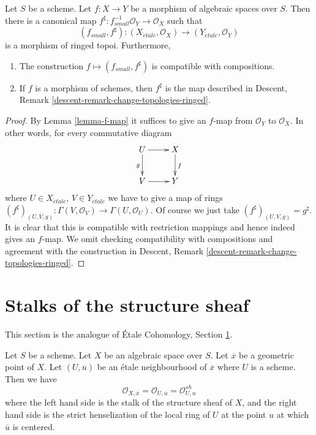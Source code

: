 \begin{lemma}
\label{lemma-morphism-ringed-topoi}
Let $S$ be a scheme.
Let $f : X \to Y$ be a morphism of algebraic spaces over $S$.
Then there is a canonical map
$f^\sharp : f_{small}^{-1}\mathcal{O}_Y \to \mathcal{O}_X$ such that
$$
(f_{small}, f^\sharp) :
(X_{\acute{e}tale}, \mathcal{O}_X)
\longrightarrow
(Y_{\acute{e}tale}, \mathcal{O}_Y)
$$
is a morphism of ringed topoi. Furthermore,
\begin{enumerate}
\item The construction $f \mapsto (f_{small}, f^\sharp)$ is compatible with
compositions.
\item If $f$ is a morphism of schemes, then $f^\sharp$ is the map described in
Descent, Remark \ref{descent-remark-change-topologies-ringed}.
\end{enumerate}
\end{lemma}

\begin{proof}
By Lemma \ref{lemma-f-map} it suffices to give an $f$-map from
$\mathcal{O}_Y$ to $\mathcal{O}_X$. In other words, for every
commutative diagram
$$
\xymatrix{
U \ar[d]_g \ar[r] & X \ar[d]^f \\
V \ar[r] & Y
}
$$
where $U \in X_{\acute{e}tale}$, $V \in Y_{\acute{e}tale}$ we have to give a
map of rings
$
(f^\sharp)_{(U, V, g)} :
\Gamma(V, \mathcal{O}_V)
\to
\Gamma(U, \mathcal{O}_U).
$
Of course we just take $(f^\sharp)_{(U, V, g)} = g^\sharp$.
It is clear that this is compatible with restriction mappings
and hence indeed gives an $f$-map.
We omit checking compatibility with compositions and agreement with the
construction in
Descent, Remark \ref{descent-remark-change-topologies-ringed}.
\end{proof}







\section{Stalks of the structure sheaf}
\label{section-stalks-structure-sheaf}

\noindent
This section is the analogue of
\'Etale Cohomology, Section \ref{section-stalks-structure-sheaf}.

\begin{lemma}
\label{lemma-describe-etale-local-ring}
Let $S$ be a scheme.
Let $X$ be an algebraic space over $S$.
Let $\overline{x}$ be a geometric point of $X$.
Let $(U, \overline{u})$ be an \'etale neighbourhood of $\overline{x}$
where $U$ is a scheme. Then we have
$$
\mathcal{O}_{X, \overline{x}} =
\mathcal{O}_{U, \overline{u}} =
\mathcal{O}_{U, u}^{sh}
$$
where the left hand side is the stalk of the structure sheaf of $X$,
and the right hand side is the strict henselization of the local ring
of $U$ at the point $u$ at which $\overline{u}$ is centered.
\end{lemma}

